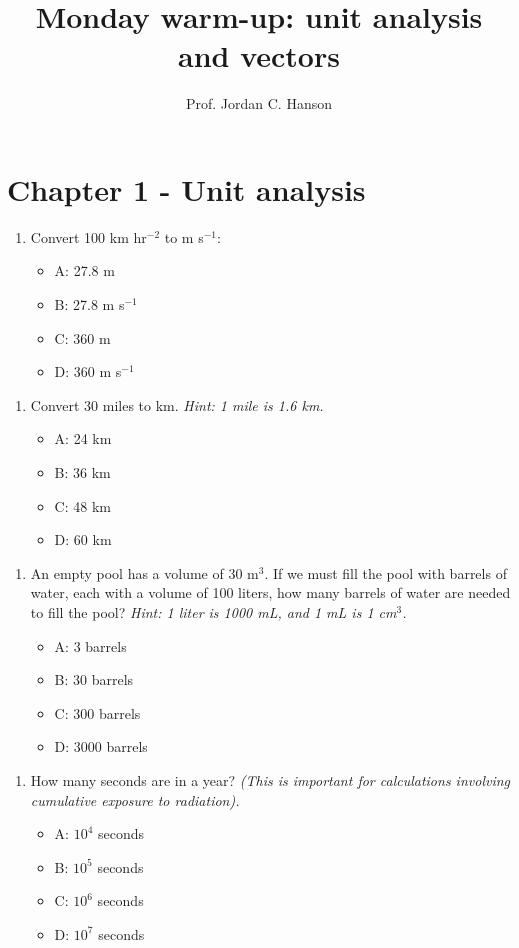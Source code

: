 \documentclass{article}
\begin{document}
\twocolumn

\title{Monday warm-up: unit analysis and vectors}
\author{Prof. Jordan C. Hanson}

\maketitle

\section{Chapter 1 - Unit analysis}

\begin{enumerate}
\item Convert 100 km hr$^{-2}$ to m s$^{-1}$:
\begin{itemize}
\item A: 27.8 m
\item B: 27.8 m s$^{-1}$
\item C: 360 m
\item D: 360 m s$^{-1}$
\end{itemize}
\end{enumerate}

\begin{enumerate}
\item Convert 30 miles to km.  \textit{Hint: 1 mile is 1.6 km.}
\begin{itemize}
\item A: 24 km
\item B: 36 km
\item C: 48 km
\item D: 60 km
\end{itemize}
\end{enumerate}

\begin{enumerate}
\item An empty pool has a volume of 30 m$^3$.  If we must fill the pool with barrels of water, each with a volume of 100 liters, how many barrels of water are needed to fill the pool? \textit{Hint: 1 liter is 1000 mL, and 1 mL is 1 cm$^3$.}
\begin{itemize}
\item A: 3 barrels
\item B: 30 barrels
\item C: 300 barrels
\item D: 3000 barrels
\end{itemize}
\end{enumerate}

\begin{enumerate}
\item How many seconds are in a year? \textit{(This is important for calculations involving cumulative exposure to radiation).}
\begin{itemize}
\item A: $10^4$ seconds
\item B: $10^5$ seconds
\item C: $10^6$ seconds
\item D: $10^7$ seconds
\end{itemize}
\end{enumerate}
\end{document}
